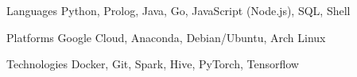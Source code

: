 \begin{cvskills}

\cvskill
    {Languages}
    {Python, Prolog, Java, Go, JavaScript (Node.js), SQL, Shell}

\cvskill
    {Platforms}
    {Google Cloud, Anaconda, Debian/Ubuntu, Arch Linux}

\cvskill
    {Technologies}
    {Docker, Git, Spark, Hive, PyTorch, Tensorflow}

\end{cvskills}
